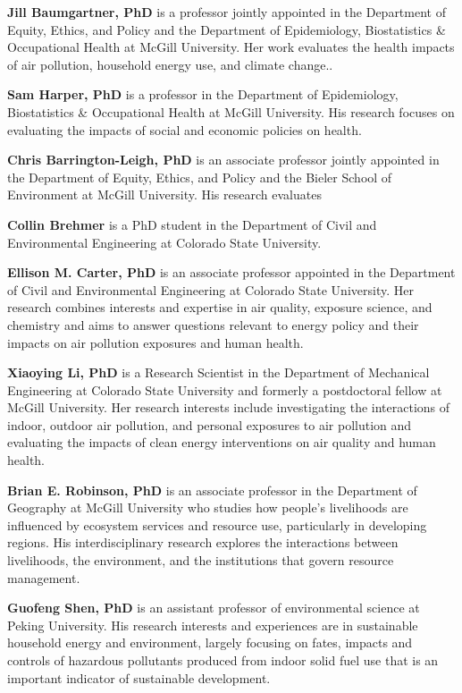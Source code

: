 \documentclass[
  letterpaper,
  DIV=11,
  numbers=noendperiod]{scrartcl}
\begin{document}
\textbf{Jill Baumgartner, PhD} is a professor jointly appointed in the
Department of Equity, Ethics, and Policy and the Department of
Epidemiology, Biostatistics \& Occupational Health at McGill University.
Her work evaluates the health impacts of air pollution, household energy
use, and climate change..

\textbf{Sam Harper, PhD} is a professor in the Department of
Epidemiology, Biostatistics \& Occupational Health at McGill University.
His research focuses on evaluating the impacts of social and economic
policies on health.

\textbf{Chris Barrington-Leigh, PhD} is an associate professor jointly
appointed in the Department of Equity, Ethics, and Policy and the Bieler
School of Environment at McGill University. His research evaluates

\textbf{Collin Brehmer} is a PhD student in the Department of Civil and
Environmental Engineering at Colorado State University.

\textbf{Ellison M. Carter, PhD} is an associate professor appointed in
the Department of Civil and Environmental Engineering at Colorado State
University. Her research combines interests and expertise in air
quality, exposure science, and chemistry and aims to answer questions
relevant to energy policy and their impacts on air pollution exposures
and human health.

\textbf{Xiaoying Li, PhD} is a Research Scientist in the Department of
Mechanical Engineering at Colorado State University and formerly a
postdoctoral fellow at McGill University. Her research interests include
investigating the interactions of indoor, outdoor air pollution, and
personal exposures to air pollution and evaluating the impacts of clean
energy interventions on air quality and human health.

\textbf{Brian E. Robinson, PhD} is an associate professor in the
Department of Geography at McGill University who studies how people's
livelihoods are influenced by ecosystem services and resource use,
particularly in developing regions. His interdisciplinary research
explores the interactions between livelihoods, the environment, and the
institutions that govern resource management.

\textbf{Guofeng Shen, PhD} is an assistant professor of environmental
science at Peking University. His research interests and experiences are
in sustainable household energy and environment, largely focusing on
fates, impacts and controls of hazardous pollutants produced from indoor
solid fuel use that is an important indicator of sustainable
development.
\end{document}
